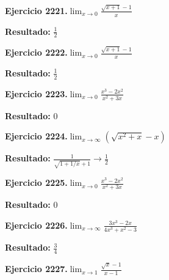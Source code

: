 \documentclass[10pt,a4paper]{article}
\begin{document}
\begin{ejbox}
\textbf{Ejercicio 2221.}\quad $\lim_{x\to 0} \frac{\sqrt{x+1}-1}{x}$
\end{ejbox}

\begin{solbox}
\textbf{Resultado:} \(\displaystyle \frac{1}{2}\)
\end{solbox}

\newpage
\begin{ejbox}
\textbf{Ejercicio 2222.}\quad $\lim_{x\to 0} \frac{\sqrt{x+1}-1}{x}$
\end{ejbox}

\begin{solbox}
\textbf{Resultado:} \(\displaystyle \frac{1}{2}\)
\end{solbox}

\begin{ejbox}
\textbf{Ejercicio 2223.}\quad $\lim_{x\to 0} \frac{x^3-2x^2}{x^2+3x}$
\end{ejbox}

\begin{solbox}
\textbf{Resultado:} \(\displaystyle 0\)
\end{solbox}

\begin{ejbox}
\textbf{Ejercicio 2224.}\quad $\lim_{x\to \infty} (\sqrt{x^2+x} - x)$
\end{ejbox}

\begin{solbox}
\textbf{Resultado:} \(\displaystyle \frac{1}{\sqrt{1+1/x}+1} \to \frac{1}{2}\)
\end{solbox}

\newpage
\begin{ejbox}
\textbf{Ejercicio 2225.}\quad $\lim_{x\to 0} \frac{x^3-2x^2}{x^2+3x}$
\end{ejbox}

\begin{solbox}
\textbf{Resultado:} \(\displaystyle 0\)
\end{solbox}

\begin{ejbox}
\textbf{Ejercicio 2226.}\quad $\lim_{x\to \infty} \frac{3x^3 - 2x}{4x^3 + x^2 - 3}$
\end{ejbox}

\begin{solbox}
\textbf{Resultado:} \(\displaystyle \frac{3}{4}\)
\end{solbox}

\begin{ejbox}
\textbf{Ejercicio 2227.}\quad $\lim_{x\to 1} \frac{\sqrt{x}-1}{x-1}$
\end{ejbox}
\end{document}
